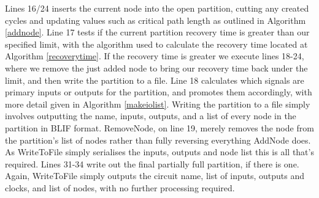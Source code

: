 \documentclass[12pt,final,oneside]{article} %
\begin{document}
Lines 16/24 inserts the current node into the open partition, cutting any created cycles and updating values such as critical path length as outlined in Algorithm \ref{addnode}.
Line 17 tests if the current partition recovery time is greater than our specified limit, with the algorithm used to calculate the recovery time located at Algorithm \ref{recoverytime}.
If the recovery time is greater we execute lines 18-24, where we remove the just added node to bring our recovery time back under the limit, and then write the partition to a file.
Line 18 calculates which signals are primary inputs or outputs for the partition, and promotes them accordingly, with more detail given in Algorithm \ref{makeiolist}.
Writing the partition to a file simply involves outputting the name, inputs, outputs, and a list of every node in the partition in \ac{BLIF} format.
RemoveNode, on line 19, merely removes the node from the partition's list of nodes rather than fully reversing everything AddNode does. As WriteToFile simply serialises the inputs, outputs and node list this is all that's required.
Lines 31-34 write out the final partially full partition, if there is one. Again, WriteToFile simply outputs the circuit name, list of inputs, outputs and clocks, and list of nodes, with no further processing required.


\newpage
\end{document}
